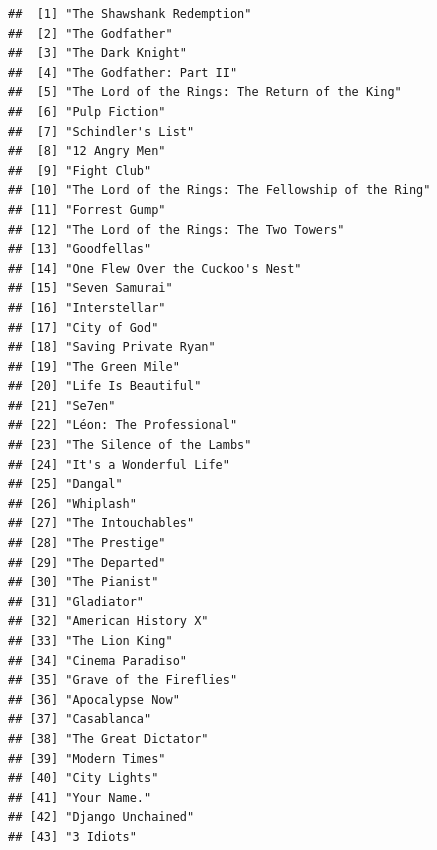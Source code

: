 \documentclass[]{book}
\begin{document}
\begin{verbatim}
##  [1] "The Shawshank Redemption"                         
##  [2] "The Godfather"                                    
##  [3] "The Dark Knight"                                  
##  [4] "The Godfather: Part II"                           
##  [5] "The Lord of the Rings: The Return of the King"    
##  [6] "Pulp Fiction"                                     
##  [7] "Schindler's List"                                 
##  [8] "12 Angry Men"                                     
##  [9] "Fight Club"                                       
## [10] "The Lord of the Rings: The Fellowship of the Ring"
## [11] "Forrest Gump"                                     
## [12] "The Lord of the Rings: The Two Towers"            
## [13] "Goodfellas"                                       
## [14] "One Flew Over the Cuckoo's Nest"                  
## [15] "Seven Samurai"                                    
## [16] "Interstellar"                                     
## [17] "City of God"                                      
## [18] "Saving Private Ryan"                              
## [19] "The Green Mile"                                   
## [20] "Life Is Beautiful"                                
## [21] "Se7en"                                            
## [22] "Léon: The Professional"                           
## [23] "The Silence of the Lambs"                         
## [24] "It's a Wonderful Life"                            
## [25] "Dangal"                                           
## [26] "Whiplash"                                         
## [27] "The Intouchables"                                 
## [28] "The Prestige"                                     
## [29] "The Departed"                                     
## [30] "The Pianist"                                      
## [31] "Gladiator"                                        
## [32] "American History X"                               
## [33] "The Lion King"                                    
## [34] "Cinema Paradiso"                                  
## [35] "Grave of the Fireflies"                           
## [36] "Apocalypse Now"                                   
## [37] "Casablanca"                                       
## [38] "The Great Dictator"                               
## [39] "Modern Times"                                     
## [40] "City Lights"                                      
## [41] "Your Name."                                       
## [42] "Django Unchained"                                 
## [43] "3 Idiots"                                         

\end{verbatim}
\end{document}
